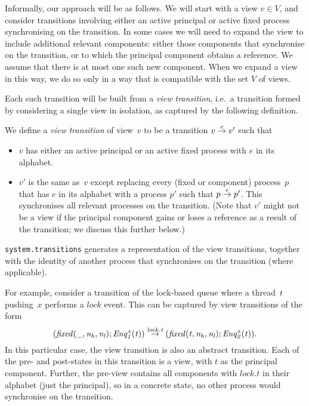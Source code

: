 Informally, our approach will be as follows.  We will start with a view $v \in
V$, and consider transitions involving either an active principal or active
fixed process synchronising on the transition.
In some cases we will need to expand
the view to include additional relevant components: either those components
that synchronise on the transition, or to which the principal component
obtains a reference.  We assume that there is at most one such new component.
When we expand a view in this way, we do so only in a way that is compatible
with the set $V$ of views.

Each such transition will be built from a \emph{view transition}, i.e.~a
transition formed by considering a single view in isolation, as captured by
the following definition.
%
\begin{definition}
We define a \emph{view transition} of view~$v$ to be a transition $v \stackrel{e}\rightarrow
v'$ such that
%
\begin{itemize}
\item $v$ has either an active principal or an active fixed process with $e$
  in its alphabet.

\item $v'$ is the same as~$v$ except replacing every (fixed or component)
  process~$p$ that has $e$ in its alphabet with a process $p'$ such that \( p
  \stackrel{e}\rightarrow p' \).  This synchronises all relevant processes on the
  transition. (Note that $v'$ might not be a view if the principal component
  gains or loses a reference as a result of the transition; we discuss this
  further below.)
\end{itemize}
\end{definition}

\begin{impNote}
\texttt{system.transitions} generates a representation of the view
  transitions, together with the identity of another process that synchronises
  on the transition (where applicable).
\end{impNote}

For example, consider a transition of the lock-based queue where a thread~$t$
pushing~$x$ performs a $lock$ event.  This can be captured by view transitions
of the form
%
\begin{equation}\it
(fixed(\_, n_h, n_l); Enq^x_1(t))  \stackrel{lock.t}\rightarrow
  (fixed(t, n_h, n_l); Enq^x_2(t)) .
\label{trans:lock}
\end{equation}
%
%
In this particular case, the view transition is also an abstract transition.
Each of the pre- and post-states in this transition is a view, with $t$ as the
principal component.  Further, the pre-view contains all components with
$lock.t$ in their alphabet (just the principal), so in a concrete state, no
other process would synchronise on the transition.

